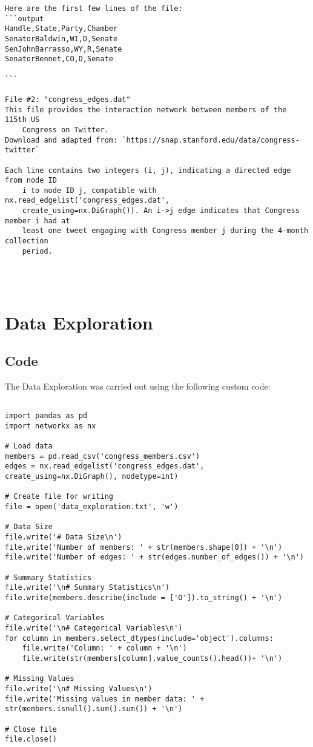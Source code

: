 \documentclass[11pt]{article}
\begin{document}
\begin{Verbatim}[tabsize=4]
Here are the first few lines of the file:
```output
Handle,State,Party,Chamber
SenatorBaldwin,WI,D,Senate
SenJohnBarrasso,WY,R,Senate
SenatorBennet,CO,D,Senate

```

File #2: "congress_edges.dat"
This file provides the interaction network between members of the 115th US
	Congress on Twitter.
Download and adapted from: `https://snap.stanford.edu/data/congress-twitter`

Each line contains two integers (i, j), indicating a directed edge from node ID
	i to node ID j, compatible with nx.read_edgelist('congress_edges.dat',
	create_using=nx.DiGraph()). An i->j edge indicates that Congress member i had at
	least one tweet engaging with Congress member j during the 4-month collection
	period.




\end{Verbatim}

\section{Data Exploration}
\subsection{{Code}}
The Data Exploration was carried out using the following custom code:

\begin{verbatim}

import pandas as pd
import networkx as nx

# Load data
members = pd.read_csv('congress_members.csv')
edges = nx.read_edgelist('congress_edges.dat', create_using=nx.DiGraph(), nodetype=int)

# Create file for writing
file = open('data_exploration.txt', 'w')

# Data Size
file.write('# Data Size\n')
file.write('Number of members: ' + str(members.shape[0]) + '\n')
file.write('Number of edges: ' + str(edges.number_of_edges()) + '\n')

# Summary Statistics
file.write('\n# Summary Statistics\n')
file.write(members.describe(include = ['O']).to_string() + '\n')

# Categorical Variables
file.write('\n# Categorical Variables\n')
for column in members.select_dtypes(include='object').columns:
    file.write('Column: ' + column + '\n')
    file.write(str(members[column].value_counts().head())+ '\n')

# Missing Values
file.write('\n# Missing Values\n')
file.write('Missing values in member data: ' + str(members.isnull().sum().sum()) + '\n')

# Close file
file.close()

\end{verbatim}
\end{document}
